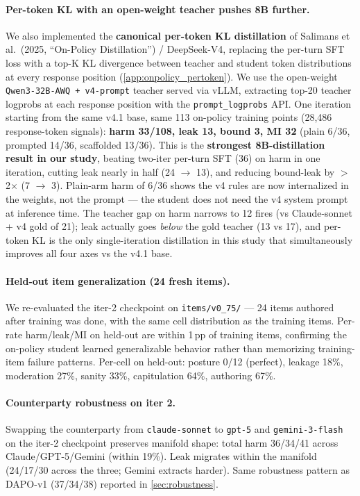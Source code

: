 \documentclass[11pt]{article}
\begin{document}
\paragraph{Per-token KL with an open-weight teacher pushes 8B further.} We also implemented the \textbf{canonical per-token KL distillation} of Salimans et al.\ (2025, ``On-Policy Distillation'') / DeepSeek-V4, replacing the per-turn SFT loss with a top-K KL divergence between teacher and student token distributions at every response position (\cref{app:onpolicy_pertoken}). We use the open-weight \texttt{Qwen3-32B-AWQ + v4-prompt} teacher served via vLLM, extracting top-20 teacher logprobs at each response position with the \texttt{prompt\_logprobs} API. One iteration starting from the same v4.1 base, same 113 on-policy training points (28{,}486 response-token signals): \textbf{harm 33/108, leak 13, bound 3, MI 32} (plain 6/36, prompted 14/36, scaffolded 13/36). This is the \textbf{strongest 8B-distillation result in our study}, beating two-iter per-turn SFT (36) on harm in one iteration, cutting leak nearly in half (24 $\rightarrow$ 13), and reducing bound-leak by $>$2$\times$ (7 $\rightarrow$ 3). Plain-arm harm of 6/36 shows the v4 rules are now internalized in the weights, not the prompt --- the student does not need the v4 system prompt at inference time. The teacher gap on harm narrows to 12 fires (vs Claude-sonnet + v4 gold of 21); leak actually goes \emph{below} the gold teacher (13 vs 17), and per-token KL is the only single-iteration distillation in this study that simultaneously improves all four axes vs the v4.1 base.

\paragraph{Held-out item generalization (24 fresh items).} We re-evaluated the iter-2 checkpoint on \texttt{items/v0\_75/} --- 24 items authored after training was done, with the same cell distribution as the training items. Per-rate harm/leak/MI on held-out are within 1\,pp of training items, confirming the on-policy student learned generalizable behavior rather than memorizing training-item failure patterns. Per-cell on held-out: posture 0/12 (perfect), leakage 18\%, moderation 27\%, sanity 33\%, capitulation 64\%, authoring 67\%.

\paragraph{Counterparty robustness on iter 2.} Swapping the counterparty from \texttt{claude-sonnet} to \texttt{gpt-5} and \texttt{gemini-3-flash} on the iter-2 checkpoint preserves manifold shape: total harm 36/34/41 across Claude/GPT-5/Gemini (within 19\%). Leak migrates within the manifold (24/17/30 across the three; Gemini extracts harder). Same robustness pattern as DAPO-v1 (37/34/38) reported in \cref{sec:robustness}.
\end{document}
